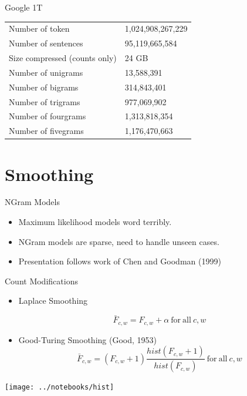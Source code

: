 \documentclass{beamer}
\begin{document}
\begin{frame}{Google 1T}

  \begin{table}
    \centering
  \begin{tabular}{ll}
    \toprule
    Number of token  &1,024,908,267,229 \\
    Number of sentences & 95,119,665,584 \\
    Size compressed (counts only) & 24 GB \\  
    \midrule
    Number of unigrams & 13,588,391 \\
    Number of bigrams & 314,843,401 \\ 
    Number of trigrams & 977,069,902 \\ 
    Number of fourgrams & 1,313,818,354 \\
    Number of fivegrams&  1,176,470,663 \\
    \bottomrule
  \end{tabular}
  \end{table}
\end{frame}

\section{Smoothing}

\begin{frame}{NGram Models}
  \begin{itemize}
  \item Maximum likelihood models word terribly.
    \air 

  \item NGram models are  sparse, need to handle unseen cases.

    \air
    

  \item Presentation follows work of Chen and Goodman (1999)
  \end{itemize}
\end{frame}

\begin{frame}{Count Modifications}
  \begin{itemize}
  \item Laplace Smoothing 

  \[ \bar{F}_{c, w}  =F_{c, w}  + \alpha   \mathrm{\ for\ all \  } c, w\]

  \item Good-Turing Smoothing (Good, 1953)
    \[ \bar{F}_{c, w} =  (F_{c, w}  + 1) \frac{hist(F_{c, w}+1)}{hist(F_{c, w})}   \mathrm{\ for\ all \  } c, w\]
  \end{itemize}
    \begin{center}
      \texttt{[image: ../notebooks/hist]}
    \end{center}

\end{frame}
\end{document}
